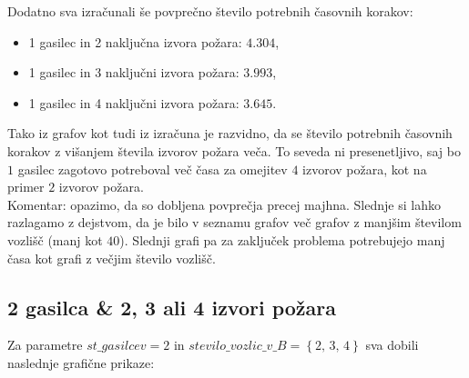 \documentclass[a4paper, 12pt]{article}
\begin{document}
\begin{figure}[!htb]
    \endminipage
\end{figure}
    
\noindent Dodatno sva izračunali še povprečno število potrebnih časovnih korakov:
\begin{itemize}
    \item 1 gasilec in 2 naključna izvora požara: $4.304$,
    \item 1 gasilec in 3 naključni izvora požara: $3.993$,
    \item 1 gasilec in 4 naključni izvora požara: $3.645$.
\end{itemize}

\noindent Tako iz grafov kot tudi iz izračuna je razvidno, da se število potrebnih časovnih korakov
z višanjem števila izvorov požara veča. To seveda ni presenetljivo, saj bo $1$ gasilec zagotovo
potreboval več časa za omejitev $4$ izvorov požara, kot na primer $2$ izvorov požara. \\

\noindent Komentar: opazimo, da so dobljena povprečja precej majhna. Slednje si lahko razlagamo z dejstvom, da je bilo v
seznamu grafov več grafov z manjšim številom vozlišč (manj kot $40$). Slednji grafi pa
za zaključek problema potrebujejo manj časa kot grafi z večjim število vozlišč. 

\subsection{2 gasilca \& 2, 3 ali 4 izvori požara}

Za parametre $st\_gasilcev = 2$ in $stevilo\_vozlic\_v\_B = \left\{ 2, \, 3, \, 4 \right\}$ sva dobili
naslednje grafične prikaze:
\end{document}
